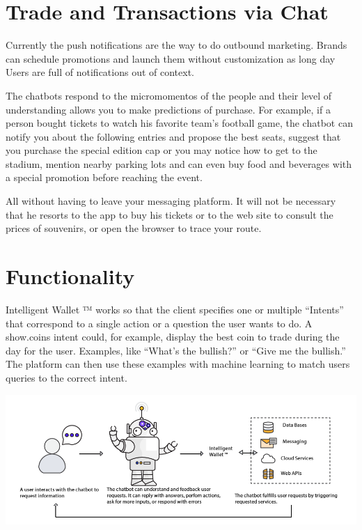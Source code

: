 \documentclass[	DIV=calc,%
							paper=letter,%
							fontsize=12pt%
                            ]{scrartcl}	 					%
\begin{document}
\section{\label{sec:level1}Trade and Transactions via Chat}

Currently the push notifications are the way to do outbound marketing.
Brands can schedule promotions and launch them without customization as long day Users are full of notifications out of context.


The chatbots respond to the micromomentos of the people and their level of understanding allows you to make predictions of purchase. For example, if a person bought tickets to watch his favorite team's football game, the chatbot can notify you about the following entries and propose the best seats, suggest that you purchase the special edition cap or you may notice how to get to the stadium, mention nearby parking lots and can even buy food and beverages with a special promotion before reaching the event.


All without having to leave your messaging platform. It will not be necessary that he resorts to the app to buy his tickets or to the web site to consult the prices of souvenirs, or open the browser to trace your route.

\section{\label{sec:level1}Functionality}

Intelligent Wallet ™ works so that the client specifies one or multiple “Intents” that correspond to a single action or a question the user wants to do. A show.coins intent could, for example, display the best coin to trade during the day for the user. Examples, like “What’s the bullish?” or “Give me the bullish.” The platform can then use these examples with machine learning to match users queries to the correct intent.

\includegraphics[scale=0.40]{img/Chatbot.png}\vspace*{1cm}
\end{document}
